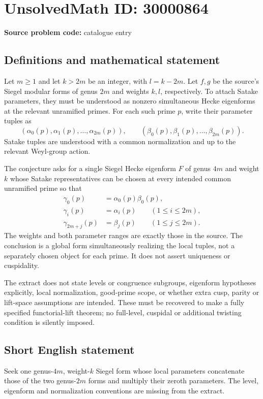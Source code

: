 \documentclass[11pt]{article}
\begin{document}
\section*{UnsolvedMath ID: 30000864}
\textbf{Source problem code:} catalogue entry
\subsection{Definitions and mathematical statement}
Let $m\geq1$ and let $k>2m$ be an integer, with $l=k-2m$. Let $f,g$ be the source's Siegel modular forms of genus $2m$ and weights $k,l$, respectively. To attach Satake parameters, they must be understood as nonzero simultaneous Hecke eigenforms at the relevant unramified primes. For each such prime $p$, write their parameter tuples as
\[
(\alpha_0(p),\alpha_1(p),\ldots,\alpha_{2m}(p)),\qquad
(\beta_0(p),\beta_1(p),\ldots,\beta_{2m}(p)).
\]
Satake tuples are understood with a common normalization and up to the relevant Weyl-group action.

The conjecture asks for a single Siegel Hecke eigenform $F$ of genus $4m$ and weight $k$ whose Satake representatives can be chosen at every intended common unramified prime so that
\[
\begin{aligned}
\gamma_0(p)&=\alpha_0(p)\beta_0(p),\\
\gamma_i(p)&=\alpha_i(p)\qquad(1\leq i\leq2m),\\
\gamma_{2m+j}(p)&=\beta_j(p)\qquad(1\leq j\leq2m).
\end{aligned}
\]
The weights and both parameter ranges are exactly those in the source. The conclusion is a global form simultaneously realizing the local tuples, not a separately chosen object for each prime. It does not assert uniqueness or cuspidality.

The extract does not state levels or congruence subgroups, eigenform hypotheses explicitly, local normalization, good-prime scope, or whether extra cusp, parity or lift-space assumptions are intended. These must be recovered to make a fully specified functorial-lift theorem; no full-level, cuspidal or additional twisting condition is silently imposed.
\subsection{Short English statement}
Seek one genus-$4m$, weight-$k$ Siegel form whose local parameters concatenate those of the two genus-$2m$ forms and multiply their zeroth parameters. The level, eigenform and normalization conventions are missing from the extract.
\end{document}
